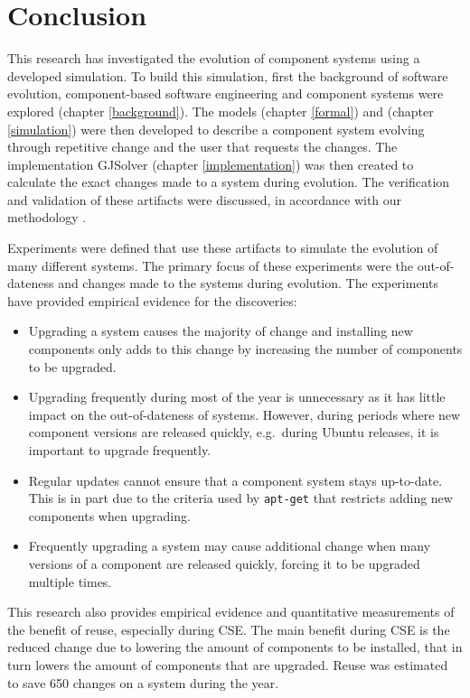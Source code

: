 \chapter{Conclusion}
\label{conclusion}
This research has investigated the evolution of component systems using a developed simulation.
To build this simulation, first the background of software evolution, component-based software engineering and component systems were explored (chapter \ref{background}).
The models \modelname (chapter \ref{formal}) and \usermodel (chapter \ref{simulation}) were then developed 
to describe a component system evolving through repetitive change and the user that requests the changes.
The implementation GJSolver (chapter \ref{implementation}) was then created to calculate the exact changes made to a system during evolution.
The verification and validation of these artifacts were discussed, in accordance with our methodology \cite{Law2005}.

Experiments were defined that use these artifacts to simulate the evolution of many different systems.
The primary focus of these experiments were the out-of-dateness and changes made to the systems during evolution.
The experiments have provided empirical evidence for the discoveries:
\begin{itemize}
  \item Upgrading a system causes the majority of change 
  and installing new components only adds to this change by increasing the number of components to be upgraded.
  \item Upgrading frequently during most of the year is unnecessary as it has little impact on the out-of-dateness of systems.
  However, during periods where new component versions are released quickly, e.g.\ during Ubuntu releases, 
  it is important to upgrade frequently. 
  \item Regular updates cannot ensure that a component system stays up-to-date.
  This is in part due to the criteria used by \texttt{apt-get} that restricts adding new components when upgrading.
  \item Frequently upgrading a system may cause additional change 
  when many versions of a component are released quickly, forcing it to be upgraded multiple times.
\end{itemize} 

This research also provides empirical evidence and quantitative measurements of the benefit of reuse, especially during CSE.
The main benefit during CSE is the reduced change due to lowering the amount of components to be installed,
that in turn lowers the amount of components that are upgraded.
Reuse was estimated to save 650 changes on a system during the year. 

